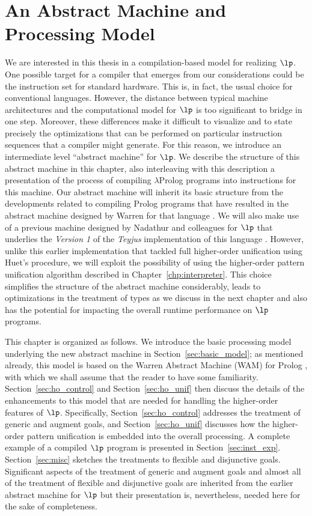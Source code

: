 \chapter{An Abstract Machine and Processing Model}\label{chp:compile}
We are interested in this thesis in a compilation-based model for
realizing $\lp$. One possible target for a compiler that emerges from
our considerations could be the instruction set for standard
hardware. This is, in fact, the usual choice for conventional
languages. However, the distance between typical machine architectures
and the computational model for $\lp$ is too significant to bridge in
one step. Moreover, these differences make it difficult to visualize
and to state precisely the optimizations that can be performed on
particular instruction sequences that a compiler might generate. For
this reason, we introduce an intermediate level ``abstract machine''
for $\lp$. We describe the structure of this abstract machine in this
chapter, also interleaving with this description a presentation of the
process of compiling $\lambda$Prolog programs into instructions for
this machine. Our abstract machine will inherit its basic structure
from the developments related to compiling Prolog programs that have
resulted in the abstract machine designed by Warren for that language
\cite{Warren83WAM}. We will also make use of a previous machine
designed by Nadathur and colleagues for $\lp$ \cite{KNW94cl,
  N03treatment, NJK95lp} that underlies the {\em Version 1} of the {\em Teyjus}
implementation of this language \cite{NM99cade}. However, unlike this
earlier implementation that tackled full higher-order unification
using Huet's procedure, we will exploit the possibility of using the
higher-order pattern unification algorithm described in
Chapter~\ref{chp:interpreter}.  This
choice simplifies the structure of the abstract machine considerably,
leads to optimizations in the treatment of types as we discuss in the
next chapter and also has the potential for impacting the overall
runtime performance on $\lp$ programs.

This chapter is organized as follows. We introduce the basic
processing model underlying the new abstract machine in
Section~\ref{sec:basic_model}; as mentioned already, this model is
based on the Warren Abstract Machine (WAM) for Prolog
\cite{Warren83WAM}, with which we shall assume that the reader to have
some familiarity.
Section~\ref{sec:ho_control} and Section~\ref{sec:ho_unif}
then discuss the details of the enhancements to this model that are
needed for handling the higher-order features of $\lp$.
Specifically, Section~\ref{sec:ho_control} addresses the treatment
of generic and augment goals, and Section~\ref{sec:ho_unif}
discusses how the higher-order pattern unification is embedded
into the overall processing.
A complete example of a compiled $\lp$ program is presented in
Section~\ref{sec:inst_exp}.
Section~\ref{sec:misc} sketches the treatments to flexible and disjunctive
goals. Significant aspects of the treatment of generic and augment
goals and almost all of the treatment of flexible and disjunctive
goals are inherited from the earlier abstract machine for $\lp$ but
their presentation is, nevertheless, needed here for the sake of
completeness.

